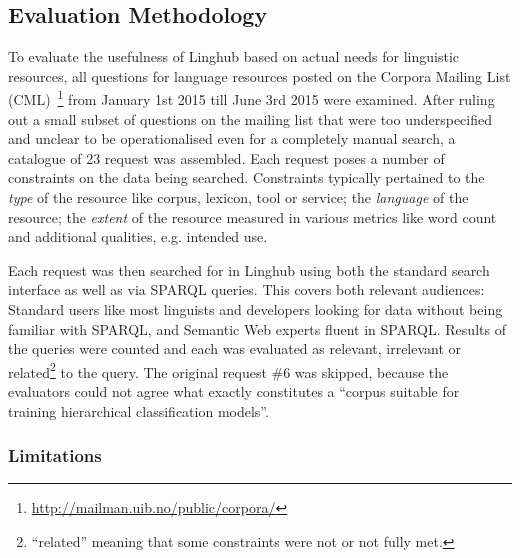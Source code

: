 \documentclass[smallextended]{svjour3}       %
\begin{document}
\subsection{Evaluation Methodology}

To evaluate the usefulness of Linghub based on actual needs for linguistic
resources, all questions for language resources posted on the Corpora Mailing
List (CML)~\footnote{\url{http://mailman.uib.no/public/corpora/}} from January
1st 2015 till June 3rd 2015 were examined. After ruling out a small subset
of questions on the mailing list that were too underspecified and unclear to be
operationalised even for a completely manual search, a catalogue of 23 request
was assembled. Each request poses a number of constraints on the data being
searched. Constraints typically pertained to the \emph{type} of the resource like
corpus, lexicon, tool or service; the \emph{language} of the resource;
the \emph{extent} of the resource measured in various metrics like word count
and additional qualities, e.g. intended use.

Each request was then searched for in Linghub using both the standard search%
interface as well as via SPARQL queries. This covers both relevant audiences:
Standard users like most linguists and developers looking for data without being
familiar with SPARQL, and Semantic Web experts fluent in SPARQL\@. Results of the
queries were counted and each was evaluated as relevant, irrelevant or related\footnote{``related'' meaning that some constraints were not or not fully met.}
to the query. The original request \#6 was skipped, because the evaluators could
not agree what exactly constitutes a ``corpus suitable for training hierarchical
classification models''. 

\subsubsection{Limitations}
\end{document}
